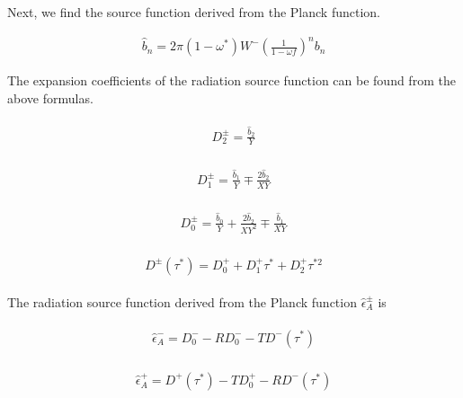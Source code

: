 Next, we find the source function derived from the Planck function.

\begin{eqnarray}
\hat{b}_{n}=2 \pi\left(1-\omega^{*}\right) W^{-}\left(\frac{1}{1-\omega f}\right)^{n} b_{n}
\end{eqnarray}

The expansion coefficients of the radiation source function can be found
from the above formulas.

\begin{eqnarray}
\begin{array}{l}
D_{2}^{\pm}=\frac{\hat{b}_{2}}{Y}
\end{array}
\end{eqnarray}

\begin{eqnarray}
\begin{array}{l}
D_{1}^{\pm}=\frac{\hat{b}_{1}}{Y} \mp \frac{2 \hat{b}_{2}}{X Y}
\end{array}
\end{eqnarray}

\begin{eqnarray}
\begin{array}{l}
D_{0}^{\pm}=\frac{\hat{b}_{0}}{Y}+\frac{2 \hat{b}_{2}}{X Y^{2}} \mp \frac{\hat{b}_{1}}{X Y}
\end{array}
\end{eqnarray}

\begin{eqnarray}
\begin{array}{l}
D^{\pm}\left(\tau^{*}\right)=D_{0}^{+}+D_{1}^{+} \tau^{*}+D_{2}^{+} \tau^{* 2}
\end{array}
\end{eqnarray}

The radiation source function derived from the Planck function
\(\hat{\epsilon}_{A}^{\pm}\) is

\begin{eqnarray}
\begin{array}{l}
\hat{\epsilon}_{A}^{-}=D_{0}^{-}-R D_{0}^{-}-T D^{-}\left(\tau^{*}\right)
\end{array}
\end{eqnarray}

\begin{eqnarray}
\begin{array}{l}
\hat{\epsilon}_{A}^{+}=D^{+}\left(\tau^{*}\right)-T D_{0}^{+}-R D^{-}\left(\tau^{*}\right)
\end{array}
\end{eqnarray}

